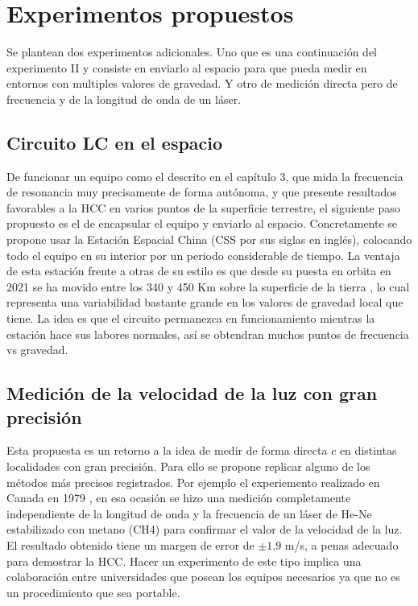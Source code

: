 \chapter{Experimentos propuestos}

Se plantean dos experimentos adicionales. Uno que es una continuación del experimento II y consiste en enviarlo al espacio para que pueda medir en entornos con multiples valores de gravedad. Y otro de medición directa pero de frecuencia y de la longitud de onda de un láser.

\section{Circuito LC en el espacio}
De funcionar un equipo como el descrito en el capítulo 3, que mida la frecuencia de resonancia muy precisamente de forma autónoma, y que presente resultados favorables a la \ac{HCC} en varios puntos de la superficie terrestre, el siguiente paso propuesto es el de encapsular el equipo y enviarlo al espacio. Concretamente se propone usar la Estación Espacial China (CSS por sus siglas en inglés), colocando todo el equipo en su interior por un periodo considerable de tiempo. La ventaja de esta estación frente a otras de su estilo es que desde su puesta en orbita en 2021 se ha movido entre los 340 y 450 Km sobre la superficie de la tierra \cite{CHINA-SPACE-STATION}, lo cual representa una variabilidad bastante grande en los valores de gravedad local que tiene. La idea es que el circuito permanezca en funcionamiento mientras la estación hace sus labores normales, así se obtendran muchos puntos de frecuencia vs gravedad.


\section{Medición de la velocidad de la luz con gran precisión}

Esta propuesta es un retorno a la idea de medir de forma directa $c$ en distintas localidades con gran precisión. Para ello se propone replicar alguno de los métodos más precisos registrados. Por ejemplo el experiemento realizado en Canada en 1979 \cite{baird1979confirmation}, en esa ocasión se hizo una medición completamente independiente de la longitud de onda y la frecuencia de un láser de He-Ne estabilizado con metano (CH4) para confirmar el valor de la velocidad de la luz. El resultado obtenido tiene un margen de error de $\pm 1.9$ m/s, a penas adecuado para demostrar la \ac{HCC}. Hacer un experimento de este tipo implica una colaboración entre universidades que posean los equipos necesarios ya que no es un procedimiento que sea portable. 
